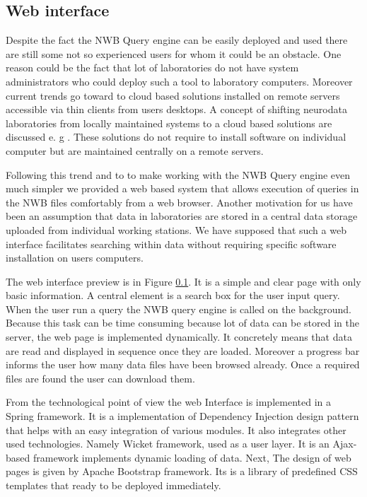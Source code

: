 \documentclass[utf8]{frontiersSCNS} %
\begin{document}
\subsection{Web interface}
\label{web_interface}

Despite the fact the NWB Query engine can be easily deployed and used there are still some not so experienced users for whom it could be an obstacle. One reason could be the fact that lot of laboratories do not have system administrators who could deploy such a tool to laboratory computers. Moreover current trends go toward to cloud based solutions installed on remote servers accessible via thin clients from users desktops. A concept of shifting neurodata laboratories from locally maintained systems to a cloud based solutions are discussed e. g \citep{ROSENTHAL2010342}. These solutions do not require to install software on individual computer but are maintained centrally on a remote servers. 

Following this trend and to to make working with the NWB Query engine even much simpler we provided a web based system that allows execution of queries in the NWB files comfortably from a web browser. Another motivation for us have been an assumption that data in laboratories are stored in a central data storage uploaded from individual working stations. We have supposed that such a web interface facilitates searching within data without requiring specific software installation on users computers.

The web interface preview is in Figure \ref{web_interface}. It is a simple and clear page with only basic information. A central element is a search box for the user input query. When the user run a query the NWB query engine is called on the background. Because this task can be time consuming because lot of data can be stored in the server, the web page is implemented dynamically. It concretely means that data are read and displayed in sequence once they are loaded. Moreover a progress bar informs the user how many data files have been browsed already. Once a required files are found the user can download them.

From the technological point of view the web Interface is implemented in a Spring framework. It is a implementation of Dependency Injection design pattern that helps with an easy integration of various modules. It also integrates other used technologies. Namely Wicket framework, used as a user layer. It is an Ajax-based framework implements dynamic loading of data. Next, The design of web pages is given by  Apache Bootstrap framework. Its is a library of predefined CSS templates that ready to be deployed immediately.
\end{document}

